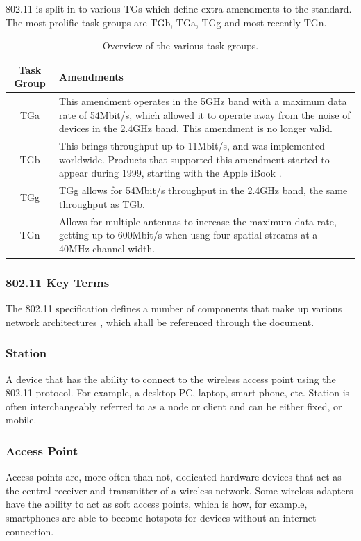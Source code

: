 802.11 is split in to various TGs which define extra amendments to the standard. The most prolific task groups are TGb, TGa, TGg and most recently TGn.

\begin{table}[htb!]
\begin{center}
	\begin{tabular}{| c | p{ 10cm } |}
		\hline
		\textbf{Task Group} & \textbf{Amendments} \\ \hline
		TGa & This amendment operates in the 5GHz band with a maximum data rate of 54Mbit/s, which allowed it to operate away from the noise of devices in the 2.4GHz band. This amendment is no longer valid. \\ \hline
		TGb & This brings throughput up to 11Mbit/s, and was implemented worldwide. Products that supported this amendment started to appear during 1999, starting with the Apple iBook \cite{intro:apple_ibook}. \\ \hline
		TGg & TGg allows for 54Mbit/s throughput in the 2.4GHz band, the same throughput as TGb. \\ \hline
		TGn & Allows for multiple antennas to increase the maximum data rate, getting up to 600Mbit/s when usng four spatial streams at a 40MHz channel width. \\ 
		\hline
	\end{tabular}
	\caption{Overview of the various task groups.}
\end{center}
\end{table}
\clearpage
\subsubsection{802.11 Key Terms}

The 802.11 specification defines a number of components that make up various network architectures \cite{intro:80211_lecture}, which shall be referenced through the document.

\subsubsection*{Station}
A device that has the ability to connect to the wireless access point using the 802.11 protocol. For example, a desktop PC, laptop, smart phone, etc. Station is often interchangeably referred to as a node or client and can be either fixed, or mobile.

\subsubsection*{Access Point}
Access points are, more often than not, dedicated hardware devices that act as the central receiver and transmitter of a wireless network. Some wireless adapters have the ability to act as soft access points, which is how, for example, smartphones are able to become hotspots for devices without an internet connection.


